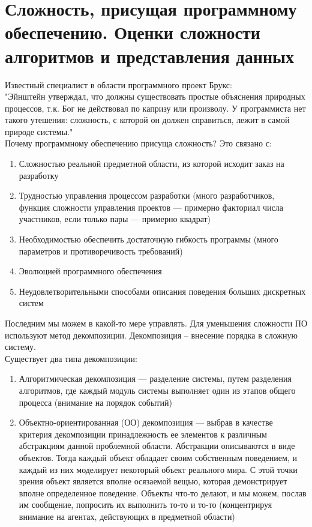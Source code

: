 \documentclass[main]{subfiles}
\begin{document}
    \section{Сложность, присущая программному обеспечению. Оценки сложности алгоритмов и представления данных}
    Известный специалист в области программного проект Брукс:\\
    "Эйнштейн утверждал, что должны существовать простые объяснения природных процессов, т.к. Бог не действовал по капризу или произволу. У программиста нет такого утешения: сложность, с которой он должен справиться, лежит в самой природе системы."{}\\

    Почему программному обеспечению присуща сложность? Это связано с:
    \begin{enumerate}
        \item Сложностью реальной предметной области, из которой исходит заказ на разработку
        \item Трудностью управления процессом разработки (много разработчиков, функция сложности управления проектов — примерно факториал числа участников, если только пары — примерно квадрат)
        \item Необходимостью обеспечить достаточную гибкость программы (много параметров и противоречивость требований)
        \item Эволюцией программного обеспечения
        \item Неудовлетворительными способами описания поведения больших дискретных систем
    \end{enumerate}
    Последним мы можем в какой-то мере управлять. Для уменьшения сложности ПО используют метод декомпозиции. Декомпозиция – внесение порядка в сложную систему.\\

    Существует два типа декомпозиции:
    \begin{enumerate}
        \item Алгоритмическая декомпозиция --- разделение системы, путем разделения алгоритмов, где каждый модуль системы выполняет один из этапов общего процесса (внимание на порядок событий)
        \item Объектно-ориентированная (ОО) декомпозиция --- выбрав в качестве критерия декомпозиции принадлежность ее элементов к различным абстракциям данной проблемной области. Абстракции описываются в виде объектов. Тогда каждый объект обладает своим собственным поведением, и каждый из них моделирует некоторый объект реального мира. С этой точки зрения объект является вполне осязаемой вещью, которая демонстрирует вполне определенное поведение. Объекты что-то делают, и мы можем, послав им сообщение, попросить их выполнить то-то и то-то (концентрируя внимание на агентах, действующих в предметной области)
    \end{enumerate}
\end{document}
